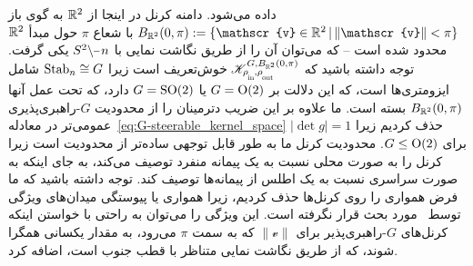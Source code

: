 داده می‌شود. دامنه کرنل در اینجا از $\mathbb{R}^2$ به گوی باز $B_{\R^2}(0,\pi) := \{ \mathscr{v}\in\R^2 \,|\, \lVert \mathscr{v}\rVert < \pi \}$ با شعاع $\pi$ حول مبدأ $\mathbb{R}^2$ محدود شده است -- که می‌توان آن را از طریق نگاشت نمایی با $S^2\backslash \mkern-1mu\minus\mkern1mu n$ یکی گرفت.
توجه داشته باشید که $\mathscr{K}^{G,B_{\R^2}(0,\pi)}_{\rhoin\mkern-1mu,\rhoout}$ خوش‌تعریف است زیرا $\operatorname{Stab}_{n} \cong G$ شامل ایزومتری‌ها است، که این دلالت بر $G=\operatorname{O}(2)$ یا $G=\operatorname{SO}(2)$ دارد، که تحت عمل آنها $B_{\mathbb{R}^2}(0,\pi)$ بسته است.
ما علاوه بر این ضریب دترمینان را از محدودیت $G$-راهبری‌پذیری عمومی‌تر در معادله~\eqref{eq:G-steerable_kernel_space} حذف کردیم زیرا ${|\!\det g| = 1}$ برای $G\leq\operatorname{O}(2)$.
محدودیت کرنل ما به طور قابل توجهی ساده‌تر از محدودیت \citet{Cohen2019-generaltheory} است زیرا کرنل را به صورت محلی نسبت به یک پیمانه منفرد توصیف می‌کند، به جای اینکه به صورت سراسری نسبت به یک اطلس از پیمانه‌ها توصیف کند.
توجه داشته باشید که ما فرض همواری را روی کرنل‌ها حذف کردیم، زیرا همواری یا پیوستگی میدان‌های ویژگی توسط~\citet{Cohen2019-generaltheory} مورد بحث قرار نگرفته است.
این ویژگی را می‌توان به راحتی با خواستن اینکه کرنل‌های $G$-راهبری‌پذیر برای $\lVert\mathscr{v}\rVert$ که به سمت $\pi$ می‌رود، به مقدار یکسانی همگرا شوند، که از طریق نگاشت نمایی متناظر با قطب جنوب است، اضافه کرد.

